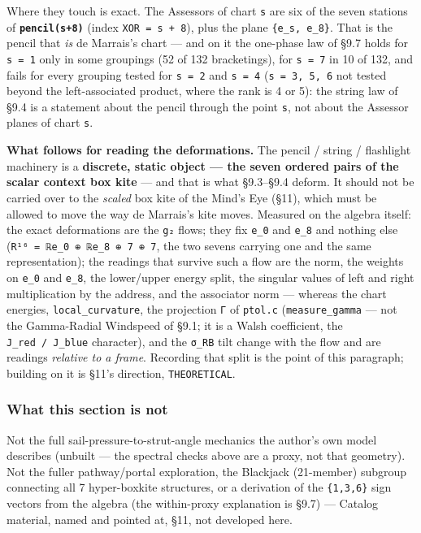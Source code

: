 \documentclass[
  10pt,
]{article}
\begin{document}
Where they touch is exact. The Assessors of chart \texttt{s} are six of
the seven stations of \textbf{\texttt{pencil(s+8)}} (index
\texttt{XOR\ =\ s\ +\ 8}), plus the plane \texttt{\{e\_s,\ e\_8\}}. That
is the pencil that \emph{is} de Marrais's chart --- and on it the
one-phase law of §9.7 holds for \texttt{s\ =\ 1} only in some groupings
(52 of 132 bracketings), for \texttt{s\ =\ 7} in 10 of 132, and fails
for every grouping tested for \texttt{s\ =\ 2} and \texttt{s\ =\ 4}
(\texttt{s\ =\ 3,\ 5,\ 6} not tested beyond the left-associated product,
where the rank is 4 or 5): the string law of §9.4 is a statement about
the pencil through the point \texttt{s}, not about the Assessor planes
of chart \texttt{s}.

\textbf{What follows for reading the deformations.} The pencil / string
/ flashlight machinery is a \textbf{discrete, static object --- the
seven ordered pairs of the scalar context box kite} --- and that is what
§9.3--§9.4 deform. It should not be carried over to the \emph{scaled}
box kite of the Mind's Eye (§11), which must be allowed to move the way
de Marrais's kite moves. Measured on the algebra itself: the exact
deformations are the \texttt{g₂} flows; they fix \texttt{e\_0} and
\texttt{e\_8} and nothing else
(\texttt{R¹⁶\ =\ ℝe\_0\ ⊕\ ℝe\_8\ ⊕\ 7\ ⊕\ 7}, the two sevens carrying
one and the same representation); the readings that survive such a flow
are the norm, the weights on \texttt{e\_0} and \texttt{e\_8}, the
lower/upper energy split, the singular values of left and right
multiplication by the address, and the associator norm --- whereas the
chart energies, \texttt{local\_curvature}, the projection \texttt{Γ} of
\texttt{ptol.c} (\texttt{measure\_gamma} --- not the Gamma-Radial
Windspeed of §9.1; it is a Walsh coefficient, the
\texttt{J\_red\ /\ J\_blue} character), and the \texttt{σ\_RB} tilt
change with the flow and are readings \emph{relative to a frame}.
Recording that split is the point of this paragraph; building on it is
§11's direction, \texttt{THEORETICAL}.

\hypertarget{what-this-section-is-not-1}{%
\subsubsection{What this section is
not}\label{what-this-section-is-not-1}}

Not the full sail-pressure-to-strut-angle mechanics the author's own
model describes (unbuilt --- the spectral checks above are a proxy, not
that geometry). Not the fuller pathway/portal exploration, the Blackjack
(21-member) subgroup connecting all 7 hyper-boxkite structures, or a
derivation of the \texttt{\{1,3,6\}} sign vectors from the algebra (the
within-proxy explanation is §9.7) --- Catalog material, named and
pointed at, §11, not developed here.
\end{document}
